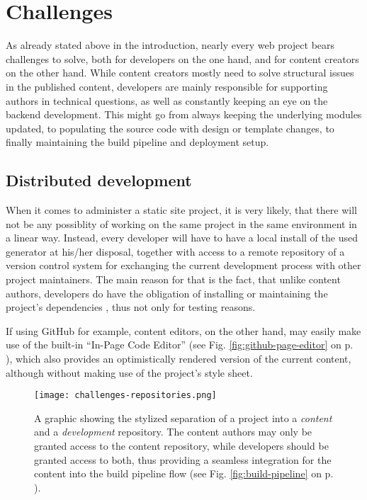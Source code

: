 \section{Challenges}
\label{sec:challenges}

As already stated above in the introduction, nearly every web project bears challenges to solve, both for developers on the one hand, and for content creators on the other hand. While content creators mostly need to solve structural issues in the published content, developers are mainly responsible for supporting authors in technical questions, as well as constantly keeping an eye on the backend development. This might go from always keeping the underlying modules updated, to populating the source code with design or template changes, to finally maintaining the build pipeline and deployment setup.

\subsection{Distributed development}
\label{sec:challenges-distributeddevelopment}

When it comes to administer a static site project, it is very likely, that there will not be any possiblity of working on the same project in the same environment in a linear way. Instead, every developer will have to have a local install of the used generator at his/her disposal, together with access to a remote repository of a version control system for exchanging the current development process with other project maintainers. The main reason for that is the fact, that unlike content authors, developers do have the obligation of installing or maintaining the project's dependencies \cite[85]{dhillon2016}, thus not only for testing reasons.

If using GitHub for example, content editors, on the other hand, may easily make use of the built-in ``In-Page Code Editor'' (see Fig. \ref{fig:github-page-editor} on p. \pageref{fig:github-page-editor}), which also provides an optimistically rendered version of the current content, although without making use of the project's style sheet.

\begin{figure} %
    \centering
    \texttt{[image: challenges-repositories.png]}
    \caption{A graphic showing the stylized separation of a project into a \emph{content} and a \emph{development} repository. The content authors may only be granted access to the content repository, while developers should be granted access to both, thus providing a seamless integration for the content into the build pipeline flow (see Fig. \ref{fig:build-pipeline} on p. \pageref{fig:build-pipeline}).}
    \label{fig:repository-separation}
\end{figure}
%

